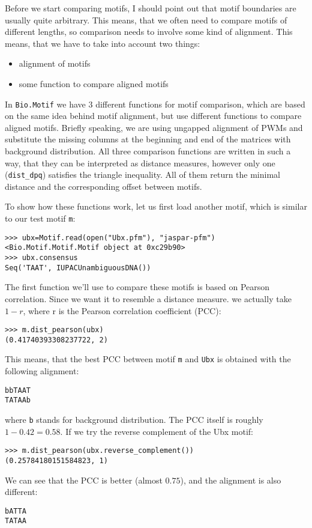 \documentclass{article}
\begin{document}
Before we start comparing motifs, I should point out that motif
boundaries are usually quite arbitrary. This means, that we often need
to compare motifs of different lengths, so comparison needs to involve
some kind of alignment.  This means, that we have to take into account two things:
\begin{itemize}
\item alignment of motifs
\item some function to compare aligned motifs
\end{itemize}
In \verb|Bio.Motif| we have 3 different functions for motif
comparison, which are based on the same idea behind motif alignment,
but use different functions to compare aligned motifs. Briefly
speaking, we are using ungapped alignment of PWMs and substitute the
missing columns at the beginning and end of the matrices with
background distribution. All three comparison functions are written in
such a way, that they can be interpreted as distance measures, however
only one (\verb|dist_dpq|) satisfies the triangle inequality. All of
them return the minimal distance and the corresponding offset between
motifs.

To show how these functions work, let us first load another motif,
which is similar to our test motif \verb|m|:
\begin{verbatim}
>>> ubx=Motif.read(open("Ubx.pfm"), "jaspar-pfm")
<Bio.Motif.Motif.Motif object at 0xc29b90>
>>> ubx.consensus
Seq('TAAT', IUPACUnambiguousDNA())
\end{verbatim}

The first function we'll use to compare these motifs is based on
Pearson correlation. Since we want it to resemble a distance
measure. we actually take $1-r$, where r is the Pearson correlation
coefficient (PCC):
\begin{verbatim}
>>> m.dist_pearson(ubx)
(0.41740393308237722, 2)
\end{verbatim}
This means, that the best PCC between motif \verb|m| and  \verb|Ubx| is obtained with the following alignment:
\begin{verbatim}
bbTAAT
TATAAb
\end{verbatim}
where \verb|b| stands for background distribution. The PCC itself is
roughly $1-0.42=0.58$. If we try the reverse complement of the Ubx motif:

\begin{verbatim}
>>> m.dist_pearson(ubx.reverse_complement())
(0.25784180151584823, 1)
\end{verbatim}
We can see that the PCC is better (almost $0.75$), and the alignment is also different:
\begin{verbatim}
bATTA
TATAA
\end{verbatim}
\end{document}
